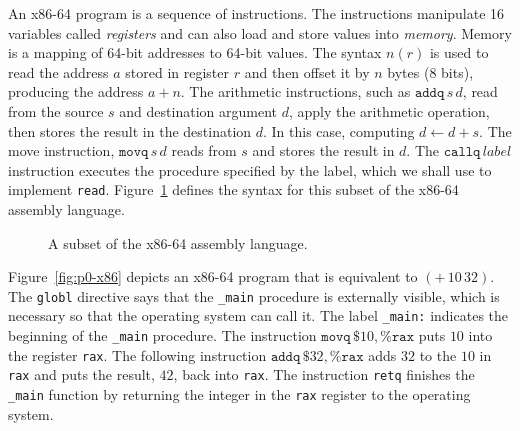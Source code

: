 \documentclass[12pt]{book}
\newcommand{\itm}[1]{\ensuremath{\mathit{#1}}}
\newcommand{\Instr}{\itm{instr}}
\newcommand{\Prog}{\itm{prog}}
\newcommand{\Arg}{\itm{arg}}
\newcommand{\Int}{\itm{int}}
\newcommand{\key}[1]{\texttt{#1}}
\newcommand{\BINOP}[3]{(\key{#1}\,#2\,#3)}
\begin{document}
An x86-64 program is a sequence of instructions. The instructions
manipulate 16 variables called \emph{registers} and can also load and
store values into \emph{memory}. Memory is a mapping of 64-bit
addresses to 64-bit values. The syntax $n(r)$ is used to read the
address $a$ stored in register $r$ and then offset it by $n$ bytes (8
bits), producing the address $a + n$. The arithmetic instructions,
such as $\key{addq}\,s\,d$, read from the source $s$ and destination
argument $d$, apply the arithmetic operation, then stores the result
in the destination $d$. In this case, computing $d \gets d + s$.  The
move instruction, $\key{movq}\,s\,d$ reads from $s$ and stores the
result in $d$. The $\key{callq}\,\mathit{label}$ instruction executes
the procedure specified by the label, which we shall use to implement
\key{read}. Figure~\ref{fig:x86-a} defines the syntax for this subset
of the x86-64 assembly language.

\begin{figure}[tbp]
\fbox{
\begin{minipage}{0.96\textwidth}
\[
\begin{array}{lcl}
\itm{register} &::=& \key{rsp} \mid \key{rbp} \mid \key{rax} \mid \key{rbx} \mid \key{rcx}
              \mid \key{rdx} \mid \key{rsi} \mid \key{rdi} \mid \\
              && \key{r8} \mid \key{r9} \mid \key{r10}
              \mid \key{r11} \mid \key{r12} \mid \key{r13}
              \mid \key{r14} \mid \key{r15} \\
\Arg &::=&  \key{\$}\Int \mid \key{\%}\itm{register} \mid \Int(\key{\%}\itm{register}) \\ 
\Instr &::=& \key{addq} \; \Arg, \Arg \mid 
      \key{subq} \; \Arg, \Arg \mid 
      \key{imulq} \; \Arg,\Arg \mid 
      \key{negq} \; \Arg \mid \\
  && \key{movq} \; \Arg, \Arg \mid 
      \key{callq} \; \mathit{label} \mid
      \key{pushq}\;\Arg \mid \key{popq}\;\Arg \mid \key{retq} \\
\Prog &::= & \key{.globl \_main}\\
      &    & \key{\_main:} \; \Instr^{+}
\end{array}
\]
\end{minipage}
}
\caption{A subset of the x86-64 assembly language.}
\label{fig:x86-a}
\end{figure}

Figure~\ref{fig:p0-x86} depicts an x86-64 program that is equivalent
to $\BINOP{+}{10}{32}$. The \key{globl} directive says that the
\key{\_main} procedure is externally visible, which is necessary so
that the operating system can call it. The label \key{\_main:}
indicates the beginning of the \key{\_main} procedure.  The
instruction $\key{movq}\,\$10, \%\key{rax}$ puts $10$ into the
register \key{rax}. The following instruction $\key{addq}\,\key{\$}32,
\key{\%rax}$ adds $32$ to the $10$ in \key{rax} and puts the result,
$42$, back into \key{rax}. The instruction \key{retq} finishes the
\key{\_main} function by returning the integer in the \key{rax}
register to the operating system.
\end{document}

